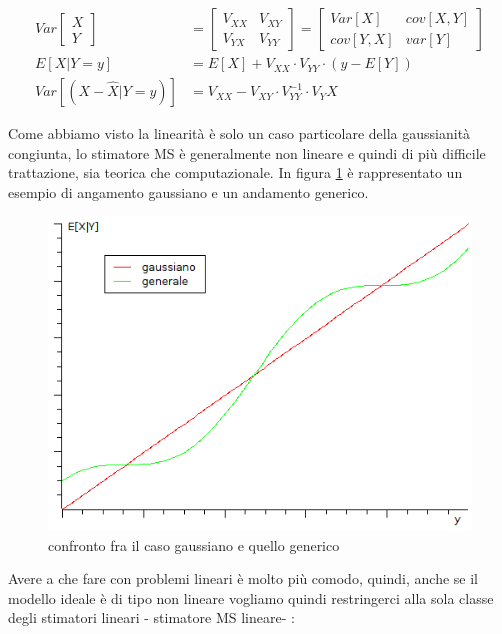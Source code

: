   \begin{align*}
    Var\begin{bmatrix} X \\ Y\end{bmatrix} &=\begin{bmatrix} V_{XX} & V_{XY} \\ V_{YX} & V_{YY} \end{bmatrix}=\begin{bmatrix} Var[X] & cov[X,Y] \\ cov[Y,X] & var[Y]\end{bmatrix} \\
    E[X|Y=y]&=E[X]+V_{XX} \cdot V_{YY} \cdot (y-E[Y]) \\
    Var\left[(X-\hat{X}|Y=y)\right]&=V_{XX}-V_{XY} \cdot V_{YY}^{-1} \cdot V_YX
  \end{align*}
  
Come abbiamo visto la linearità è solo un caso particolare della gaussianità congiunta, lo stimatore MS è generalmente non lineare e quindi di più difficile trattazione, sia teorica che computazionale. In figura \ref{fig:confrontogaussgenerico} è rappresentato un esempio di angamento gaussiano e un andamento generico.

  \begin{figure}[htbp]
    \centering
    \includegraphics[scale=0.5]{img/gaussgeneral.png}
    \caption{confronto fra il caso gaussiano e quello generico\label{fig:confrontogaussgenerico}}
  \end{figure}

Avere a che fare con problemi lineari è molto più comodo, quindi, anche se il modello ideale è di tipo non lineare vogliamo quindi restringerci alla sola classe degli stimatori lineari - stimatore MS lineare- :


